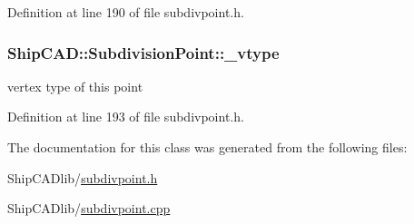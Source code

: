Definition at line 190 of file subdivpoint.\-h.

\hypertarget{classShipCAD_1_1SubdivisionPoint_a37f4626c2c18a4838f693464d93ad291}{
\subsubsection[{\-\_\-vtype}]{ Ship\-C\-A\-D\-::\-Subdivision\-Point\-::\-\_\-vtype\hspace{0.3cm}{\ttfamily [protected]}}}\label{classShipCAD_1_1SubdivisionPoint_a37f4626c2c18a4838f693464d93ad291}
vertex type of this point 

Definition at line 193 of file subdivpoint.\-h.



The documentation for this class was generated from the following files\-:\begin{DoxyCompactItemize}
\item 
Ship\-C\-A\-Dlib/\hyperlink{subdivpoint_8h}{subdivpoint.\-h}\item 
Ship\-C\-A\-Dlib/\hyperlink{subdivpoint_8cpp}{subdivpoint.\-cpp}\end{DoxyCompactItemize}
